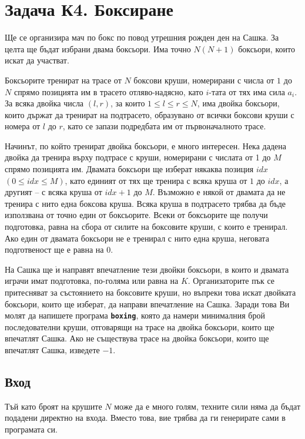 \documentclass[12pt]{article}
\begin{document}
	
	\section{Задача К4. Боксиране}
	
	
	Ще се организира мач по бокс по повод утрешния рожден ден на Сашка. За целта ще бъдат избрани двама боксьори. Има точно $N(N+1)$ боксьори, които искат да участват.
	
	Боксьорите тренират на трасе от $N$ боксови круши, номерирани с числа от $1$ до $N$ спрямо позицията им в трасето отляво-надясно, като $i$-тата от тях има сила $a_i$. За всяка двойка числа $(l,r)$, за които $1 \leq l \leq r \leq N$, има двойка боксьори, които държат да тренират на подтрасето, образувано от всички боксови круши с номера от $l$ до $r$, като се запази подредбата им от първоначалното трасе. 
	
	Начинът, по който тренират двойка боксьори, е много интересен. Нека дадена двойка да тренира върху подтрасе с круши, номерирани с числата от 1 до $M$ спрямо позицията им. Двамата боксьори ще изберат някаква позиция $idx$ $(0 \leq idx \leq M)$, като единият от тях ще тренира с всяка круша от $1$ до $idx$, а другият – с всяка круша от $idx+1$ до $M$. Възможно е някой от двамата да не тренира с нито една боксова круша. Всяка круша в подтрасето трябва да бъде използвана от точно един от боксьорите. Всеки от боксьорите ще получи подготовка, равна на сбора от силите на боксовите круши, с които е тренирал. Ако един от двамата боксьори не е тренирал с нито една круша, неговата подготвеност ще е равна на $0$. 
	
	На Сашка ще $\grave{\text{и}}$ направят впечатление тези двойки боксьори, в които и двамата играчи имат подготовка, по-голяма или равна на $K$. Организаторите пък се притесняват за състоянието на боксовите круши, но въпреки това искат двойката боксьори, които ще изберат, да направи впечатление на Сашка. Заради това Ви молят да напишете програма \texttt{\textbf{boxing}}, която да намери минималния брой последователни круши, отговарящи на трасе на двойка боксьори, които ще впечатлят Сашка. Ако не съществува трасе на двойка боксьори, които ще впечатлят Сашка, изведете $-1$.
	
	\subsection{Вход}
	Тъй като броят на крушите $N$ може да е много голям, техните сили няма да бъдат подадени директно на входа. Вместо това, вие трябва да ги генерирате сами в програмата си. 
	
\end{document}
